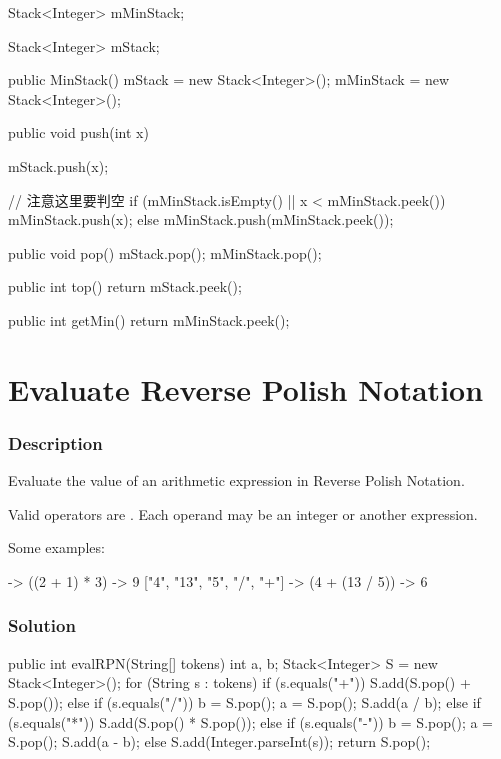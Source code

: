 \begin{Code}
Stack<Integer> mMinStack;

Stack<Integer> mStack;

public MinStack() {
    mStack = new Stack<Integer>();
    mMinStack = new Stack<Integer>();
}

public void push(int x) {
    mStack.push(x);

    // 注意这里要判空
    if (mMinStack.isEmpty() || x < mMinStack.peek()) {
        mMinStack.push(x);
    } else {
        mMinStack.push(mMinStack.peek());
    }
}

public void pop() {
    mStack.pop();
    mMinStack.pop();
}

public int top() {
    return mStack.peek();
}

public int getMin() {
    return mMinStack.peek();
}
\end{Code}

\newpage

\section{Evaluate Reverse Polish Notation} %

\subsubsection{Description}
Evaluate the value of an arithmetic expression in Reverse Polish Notation.

Valid operators are \code{+, -, *, /}. Each operand may be an integer or another expression.

Some examples:
\begin{Code}
  ["2", "1", "+", "3", "*"] -> ((2 + 1) * 3) -> 9
  ["4", "13", "5", "/", "+"] -> (4 + (13 / 5)) -> 6
\end{Code}

\subsubsection{Solution}

\begin{Code}
public int evalRPN(String[] tokens) {
    int a, b;
    Stack<Integer> S = new Stack<Integer>();
    for (String s : tokens) {
        if (s.equals("+")) {
            S.add(S.pop() + S.pop());
        } else if (s.equals("/")) {
            b = S.pop();
            a = S.pop();
            S.add(a / b);
        } else if (s.equals("*")) {
            S.add(S.pop() * S.pop());
        } else if (s.equals("-")) {
            b = S.pop();
            a = S.pop();
            S.add(a - b);
        } else {
            S.add(Integer.parseInt(s));
        }
    }
    return S.pop();
}
\end{Code}

